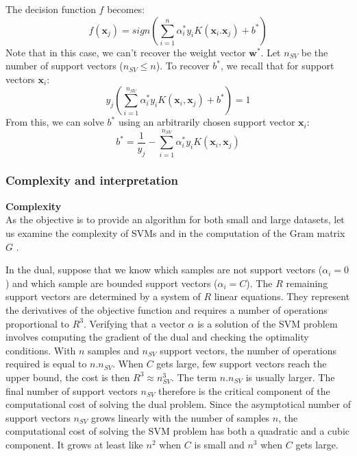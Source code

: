 \noindent The decision function $f$ becomes:
\begin{equation}
f(\textbf{x}_j) = sign(\sum\limits_{i=1}^{n} \alpha_i^*y_i K(\textbf{x}_i.\textbf{x}_j) + b^*) \label{decisionDualKernel}
\end{equation} 
\noindent Note that in this case, we can't recover the weight vector $\textbf{w}^*$.
Let $n_{SV}$ be the number of support vectors ($n_{SV} \leq n$). To recover $b^*$, we recall that for support vectors $\textbf{x}_i$:
\begin{equation}
	y_j \left( \sum\limits_{i=1}^{n_{SV}} \alpha_i^* y_i K(\textbf{x}_i,\textbf{x}_j) + b^* \right) = 1
\end{equation}
From this, we can solve $b^*$ using an arbitrarily chosen support vector $\textbf{x}_i$:
\begin{equation}
	b^* = \frac{1}{y_j} - \sum\limits_{i=1}^{n_{SV}} \alpha_i^* y_i K(\textbf{x}_i,\textbf{x}_j)
\end{equation}

\subsubsection{Complexity and interpretation}
\label{subsec:interpretation}

\noindent \textbf{Complexity} \\
As the objective is to provide an algorithm for both small and large datasets, let us examine the complexity of SVMs and in the computation of the Gram matrix $G$ \cite{Bottou2007}.

In the dual, suppose that we know which samples are not support vectors ($\alpha_i = 0$) and which sample are bounded support vectors ($\alpha_i = C$). The $R$ remaining support vectors are determined by a system of $R$ linear equations. They represent the derivatives of the objective function and requires a number of operations proportional to $R^3$. Verifying that a vector $\alpha$ is a solution of the SVM problem involves computing the gradient of the dual and checking the optimality conditions. With $n$ samples and $n_{SV}$ support vectors, the number of operations required is equal to $n.n_{SV}$. When $C$ gets large, few support vectors reach the upper bound, the cost is then $R^3 \approx n_{SV}^3$. The term $n.n_{SV}$ is usually larger. The final number of support vectors $n_{SV}$ therefore is the critical component of the computational cost of solving the dual problem. Since the asymptotical number of support vectors $n_{SV}$ grows linearly with the number of samples $n$, the computational cost of solving the SVM problem has both a quadratic and a cubic component. It grows at least like $n^2$ when $C$ is small and $n^3$ when $C$ gets large.


